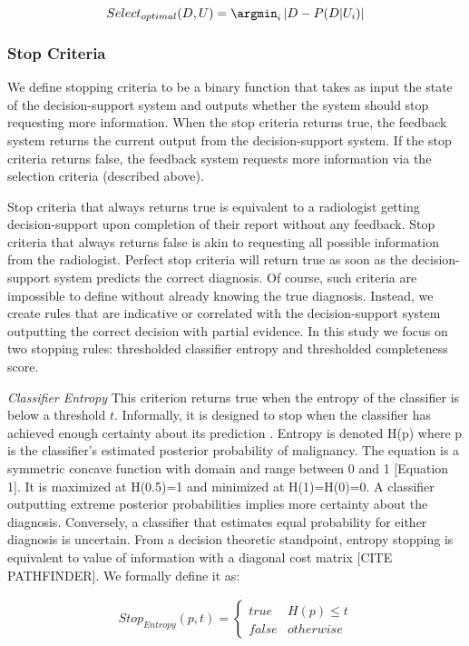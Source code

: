 \begin{equation}
Select_{optimal}(D, U) = \argmin_{i} \left|D-P(D | U_i)\right|
\end{equation}



\subsubsection{Stop Criteria}
We define stopping criteria to be a binary function that takes as input the state of the decision-support system and outputs whether the system should stop requesting more information. When the stop criteria returns true, the feedback system returns the current output from the decision-support system. If the stop criteria returns false, the feedback system requests more information via the selection criteria (described above). 

Stop criteria that always returns true is equivalent to a radiologist getting decision-support upon completion of their report without any feedback. Stop criteria that always returns false is akin to requesting all possible information from the radiologist. Perfect stop criteria will return true as soon as the decision-support system predicts the correct diagnosis. Of course, such criteria are impossible to define without already knowing the true diagnosis. Instead, we create rules that are indicative or correlated with the decision-support system outputting the correct decision with partial evidence. In this study we focus on two stopping rules: thresholded classifier entropy and thresholded completeness score.


\emph{Classifier Entropy}
This criterion returns true when the entropy of the classifier is below a threshold $t$. Informally, it is designed to stop when the classifier has achieved enough certainty about its prediction \cite{MacKay:2003wc}. Entropy is denoted H(p) where p is the classifier's estimated posterior probability of malignancy. The equation is a symmetric concave function with domain and range between  0 and 1 [Equation 1]. It is maximized at H(0.5)=1 and minimized at H(1)=H(0)=0. A classifier outputting extreme posterior probabilities implies more certainty about the diagnosis. Conversely, a classifier that estimates equal probability for either diagnosis is uncertain. From a decision theoretic standpoint, entropy stopping is equivalent to value of information with a diagonal cost matrix [CITE PATHFINDER]. We formally define it as:

\begin{align}
Stop_{Entropy}(p,t) =
\begin{cases} 
true & H(p)\leq t \\
false & otherwise
\end{cases}
\end{align}

